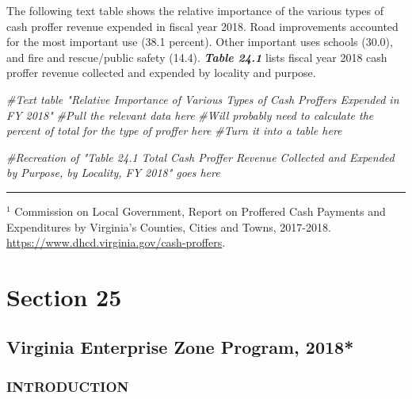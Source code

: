 \documentclass[
]{book}
\newenvironment{Shaded}{\begin{snugshade}}{\end{snugshade}}
\newcommand{\CommentTok}[1]{\textcolor[rgb]{0.56,0.35,0.01}{\textit{#1}}}
\begin{document}
The following text table shows the relative importance of the various types of cash proffer revenue expended in fiscal year 2018. Road improvements accounted for the most important use (38.1 percent). Other important uses schools (30.0), and fire and rescue/public safety (14.4). \textbf{\emph{Table 24.1}} lists fiscal year 2018 cash proffer revenue collected and expended by locality and purpose.

\begin{Shaded}
\begin{Highlighting}[]
\CommentTok{\#Text table "Relative Importance of Various Types of Cash Proffers Expended in FY 2018"}
\CommentTok{\#Pull the relevant data here}
\CommentTok{\#Will probably need to calculate the percent of total for the type of proffer here}
\CommentTok{\#Turn it into a table here}
\end{Highlighting}
\end{Shaded}

\begin{Shaded}
\begin{Highlighting}[]
\CommentTok{\#Recreation of "Table 24.1 Total Cash Proffer Revenue Collected and Expended by Purpose, by Locality, FY 2018" goes here}
\end{Highlighting}
\end{Shaded}

\begin{center}\rule{0.5\linewidth}{0.5pt}\end{center}

\(^1\) Commission on Local Government, Report on Proffered Cash Payments and Expenditures by Virginia's Counties, Cities and Towns, 2017-2018. \url{https://www.dhcd.virginia.gov/cash-proffers}.

\hypertarget{section-25}{%
\chapter{Section 25}\label{section-25}}

\hypertarget{virginia-enterprise-zone-program-2018}{%
\section{Virginia Enterprise Zone Program, 2018*}\label{virginia-enterprise-zone-program-2018}}

\hypertarget{introduction-1}{%
\subsection{INTRODUCTION}\label{introduction-1}}
\end{document}
